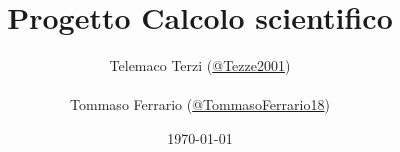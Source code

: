 \documentclass[a4paper, oneside]{report}
\title{Progetto Calcolo scientifico}
\author{
    Telemaco Terzi (\href{https://github.com/Tezze2001}{@Tezze2001}) \\\\
    Tommaso Ferrario (\href{https://github.com/TommasoFerrario18}{@TommasoFerrario18})
    }
\date{\today}
\begin{document}
\maketitle
\newtheorem{teorema}{Teorema}
\newtheorem{dimostrazione}{Dimostrazione}
\newtheorem{definizione}{Definizione}
\newtheorem{esempio}{Esempio}
\newtheorem{nota}{Nota}

\tableofcontents



\end{document}
